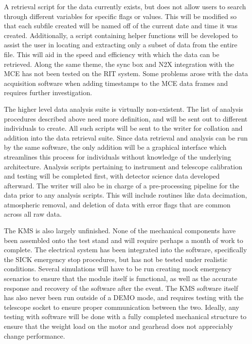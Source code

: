 \documentclass[manuscript]{aastex}
\begin{document}
A retrieval script for the data currently exists, but does not allow users to search through different variables for specific flags or values. This will be modified so that each subfile created will be named off of the current date and time it was created. Additionally, a script containing helper functions will be developed to assist the user in locating and extracting only a subset of data from the entire file. This will aid in the speed and efficiency with which the data can be retrieved. Along the same theme, the sync box and N2X integration with the MCE has not been tested on the RIT system. Some problems arose with the data acquisition software when adding timestamps to the MCE data frames and requires further investigation. 

The higher level data analysis suite is virtually non-existent. The list of analysis procedures described above need more definition, and will be sent out to different individuals to create. All such scripts will be sent to the writer for collation and addition into the data retrieval suite. Since data retrieval and analysis can be run by the same software, the only addition will be a graphical interface which streamlines this process for individuals without knowledge of the underlying architecture. Analysis scripts pertaining to instrument and telescope calibration and testing will be completed first, with detector science data developed afterward. The writer will also be in charge of a pre-processing pipeline for the data prior to any analysis scripts. This will include routines like data decimation, atmospheric removal, and deletion of data with error flags that are common across all raw data. 

The KMS is also largely unfinished. None of the mechanical components have been assembled onto the test stand and will require perhaps a month of work to complete. The electrical system has been integrated into the software, specifically the SICK emergency stop procedures, but has not be tested under realistic conditions. Several simulations will have to be run creating mock emergency scenarios to ensure that the module itself is functional, as well as the accurate response and recovery of the software after the event. The KMS software itself has also never been run outside of a DEMO mode, and requires testing with the telescope socket to ensure proper communication between the two. Ideally, any testing with software will be done with a fully completed mechanical structure to ensure that the weight load on the motor and gearhead does not appreciably change performance. 
\end{document}
